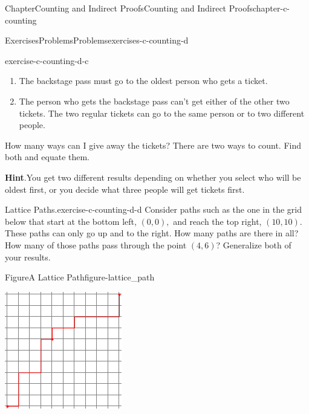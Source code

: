 \documentclass[oneside,10pt,]{book}
\newcommand{\blocktitlefont}{\relax}
\numberwithin{equation}{section}
\begin{document}
\begin{chapterptx}{Chapter}{Counting and Indirect Proofs}{}{Counting and Indirect Proofs}{}{}{chapter-c-counting}
\begin{exercises-section}{Exercises}{Problems}{}{Problems}{}{}{exercises-c-counting-d}
\begin{divisionexercise}{2}{}{}{exercise-c-counting-d-c}
\begin{enumerate}[label=(\alph*)]
\item{}The backstage pass must go to the oldest person who gets a ticket.%
\item{}The person who gets the backstage pass can't get either of the other two tickets. The two regular tickets can go to the same person or to two different people.%
\end{enumerate}
How many ways can I give away the tickets? There are two ways to count. Find both and equate them.%
\par\smallskip%
\noindent\textbf{\blocktitlefont Hint}.\hypertarget{hint-c-counting-d-c-b}{}\quad{}You get two different results depending on whether you select who will be oldest first, or you decide what three people will get tickets first.%
\end{divisionexercise}%
\begin{divisionexercise}{3}{Lattice Paths.}{}{exercise-c-counting-d-d}%
%
Consider paths such as the one in the grid below that start at the bottom left, \((0,0),\) and reach the top right, \((10,10)\).  These paths can only go up and to the right.  How many paths are there in all? How many of those paths pass through the point \((4,6)\)?  Generalize both of your results.%
\begin{figureptx}{Figure}{A Lattice Path}{figure-lattice_path}{}%
\begin{image}{0.2}{0.6}{0.2}{}%
\includegraphics[width=\linewidth]{images/lattice_path.png}

\end{image}
\end{figureptx}
\end{divisionexercise}
\end{exercises-section}
\end{chapterptx}
\end{document}
